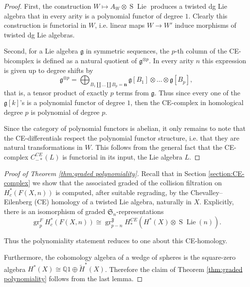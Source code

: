 \documentclass[12pt]{article}
\newcommand{\Q}{\mathbb{Q}}
\newcommand{\SymGroup}[1][n]{\mathfrak{S}_{#1}}
\newcommand{\n}[1][n]{\mathbf{#1}}
\DeclareMathOperator{\gr}{gr}
\DeclareMathOperator{\Lie}{Lie}
\DeclareMathOperator{\Suspension}{S}
\theoremstyle{plain}
\theoremstyle{definition}
\theoremstyle{remark}
\begin{document}
\begin{proof}
First, the construction $W\mapsto A_W\otimes \Suspension\Lie$ produces a twisted dg Lie algebra that in every arity is a polynomial functor of degree $1$. Clearly this construction is functorial in $W$, i.e. linear maps $W\to W'$ induce morphisms of twisted dg Lie algebras. %

Second, for a Lie algebra $\mathfrak{g}$ in symmetric sequences, the $p$-th column of the CE-bicomplex is defined as a natural quotient of $\mathfrak{g}^{\otimes p}$. In every arity $n$ this expression is given up to degree shifts by 
\[
\mathfrak{g}^{\otimes p} = \bigoplus_{B_1\coprod \ldots \coprod B_p = \n} \mathfrak{g}[B_1] \otimes \ldots \otimes \mathfrak{g}[B_p],
\]
that is, a tensor product of exactly $p$ terms from $\mathfrak{g}$. Thus since every one of the $\mathfrak{g}[k]$'s is a polynomial functor of degree $1$, then the CE-complex in homological degree $p$ is polynomial of degree $p$.

Since the category of polynomial functors is abelian, it only remains to note that the CE-differentials respect the polynomial functor structure, i.e. that they are natural transformations in $W$. This follows from the general fact that the CE-complex $C_{-\ast}^{CE}(L)$ is functorial in its input, the Lie algebra $L$. %

\end{proof}

\begin{proof}[Proof of Theorem \ref{thm:graded polynomiality}]
Recall that in Section \ref{section:CE-complex} we show that the associated graded of the collision filtration on $H^*_c(F(X,n))$ is computed, after suitable regrading, by the Chevalley--Eilenberg (CE) homology of a twisted Lie algebra, naturally in $X$. Explicitly, there is an isomorphism of graded $\SymGroup$-representations
\begin{equation}
    \gr_p^F H^{*}_c(F(X,n)) \cong \gr_{p-n}^{\mathfrak{F}} H^{CE}_{\ast}( H^*(X)\otimes \Suspension\Lie (n)).
\end{equation}

Thus the polynomiality statement reduces to one about this CE-homology.

Furthermore, the cohomology algebra of a wedge of spheres is the square-zero algebra $H^*(X) \cong \Q1\oplus \tilde{H}^*(X)$. Therefore the claim of Theorem \ref{thm:graded polynomiality} follows from the last lemma.
\end{proof}
\end{document}
